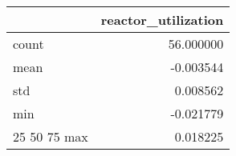 \begin{tabular}{lr}
\toprule
 & reactor\_utilization \\
\midrule
count & 56.000000 \\
mean & -0.003544 \\
std & 0.008562 \\
min & -0.021779 \\
25%
50%
75%
max & 0.018225 \\
\bottomrule
\end{tabular}

